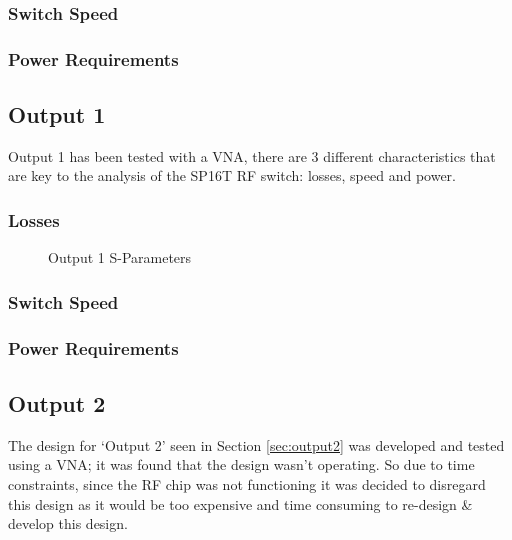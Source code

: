\documentclass[12pt,openany,a4paper]{book}
\begin{document}



\subsubsection{Switch Speed}

\subsubsection{Power Requirements}


\subsection{Output 1}
Output 1 has been tested with a VNA, there are $3$ different characteristics that are key to the analysis of the SP16T RF switch: losses, speed and power.

\subsubsection{Losses}
\begin{figure}[H]
	\centering
	\caption{Output 1 S-Parameters}
	\label{fig:output1_sp}
\end{figure} 




\subsubsection{Switch Speed}

\subsubsection{Power Requirements}


\subsection{Output 2}		\label{sec:res_out2}
The design for `Output 2' seen in Section \ref{sec:output2} was developed and tested using a VNA; it was found that the design wasn't operating. So due to time constraints, since the RF chip was not functioning it was decided to disregard this design as it would be too expensive and time consuming to re-design \& develop this design.
\end{document}
